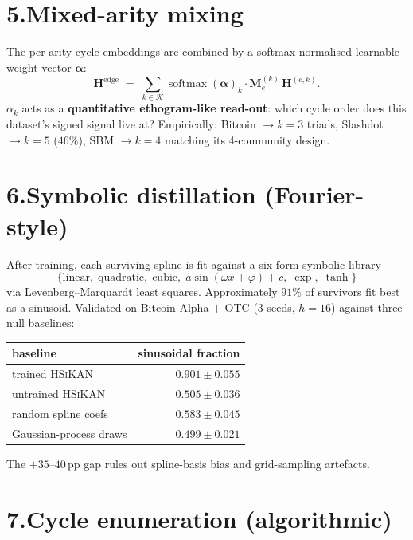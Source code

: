 \documentclass[11pt,a4paper]{article}
\newcommand{\HSiKAN}{\textsc{HSiKAN}}
\begin{document}
\section*{5.\;Mixed-arity mixing}

The per-arity cycle embeddings are combined by a softmax-normalised
learnable weight vector $\boldsymbol\alpha$:
\[
  \mathbf{H}^{\text{edge}}
  \;=\; \sum_{k \in \mathcal{K}} \operatorname{softmax}(\boldsymbol\alpha)_k
        \cdot \mathbf{M}_e^{(k)}\, \mathbf{H}^{(e, k)}.
\]
$\alpha_k$ acts as a \textbf{quantitative ethogram-like read-out}:
which cycle order does this dataset's signed signal live at?
Empirically: Bitcoin $\to k{=}3$ triads, Slashdot $\to k{=}5$
($46\%$), SBM $\to k{=}4$ matching its 4-community design.

\section*{6.\;Symbolic distillation (Fourier-style)}

After training, each surviving spline is fit against a six-form
symbolic library
\[
  \{
    \text{linear},\;
    \text{quadratic},\;
    \text{cubic},\;
    a\sin(\omega x + \varphi) + c,\;
    \exp,\;
    \tanh
  \}
\]
via Levenberg--Marquardt least squares.  Approximately $91\%$ of
survivors fit best as a sinusoid.  Validated on Bitcoin Alpha + OTC
($3$ seeds, $h{=}16$) against three null baselines:

\begin{center}
\begin{tabular}{lr}
\hline
baseline & sinusoidal fraction \\
\hline
trained \HSiKAN          & $0.901 \pm 0.055$ \\
untrained \HSiKAN        & $0.505 \pm 0.036$ \\
random spline coefs      & $0.583 \pm 0.045$ \\
Gaussian-process draws   & $0.499 \pm 0.021$ \\
\hline
\end{tabular}
\end{center}

\noindent
The $+35$--$40$\,pp gap rules out spline-basis bias and
grid-sampling artefacts.

\section*{7.\;Cycle enumeration (algorithmic)}
\end{document}
